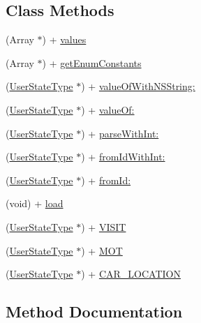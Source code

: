 \subsection*{Class Methods}
\begin{DoxyCompactItemize}
\item 
(Array $\ast$) + \hyperlink{interface_user_state_type_ac7410af507f71f5ce783c3c86fea81da}{values}
\item 
(Array $\ast$) + \hyperlink{interface_user_state_type_ac071a93de8993b92abc76691088d607a}{get\+Enum\+Constants}
\item 
(\hyperlink{interface_user_state_type}{User\+State\+Type} $\ast$) + \hyperlink{interface_user_state_type_a626874c56089cbc39f5290d61a8a79de}{value\+Of\+With\+N\+S\+String\+:}
\item 
(\hyperlink{interface_user_state_type}{User\+State\+Type} $\ast$) + \hyperlink{interface_user_state_type_a6f6918d4301c0e7ef30532d27d5bb4fe}{value\+Of\+:}
\item 
(\hyperlink{interface_user_state_type}{User\+State\+Type} $\ast$) + \hyperlink{interface_user_state_type_a741552a606b8425d11696688b4726f84}{parse\+With\+Int\+:}
\item 
(\hyperlink{interface_user_state_type}{User\+State\+Type} $\ast$) + \hyperlink{interface_user_state_type_a6039e7c90b9adaed6db9e184e3a43026}{from\+Id\+With\+Int\+:}
\item 
(\hyperlink{interface_user_state_type}{User\+State\+Type} $\ast$) + \hyperlink{interface_user_state_type_a94e6604257e4d429594803515d29027d}{from\+Id\+:}
\item 
(void) + \hyperlink{interface_user_state_type_a1b4bc0140a8726a97228332426b23031}{load}
\item 
(\hyperlink{interface_user_state_type}{User\+State\+Type} $\ast$) + \hyperlink{interface_user_state_type_a644111d61b871cd87cd6a302f6dd2686}{V\+I\+S\+I\+T}
\item 
(\hyperlink{interface_user_state_type}{User\+State\+Type} $\ast$) + \hyperlink{interface_user_state_type_a6a6671bf8cb10f2c5236cbe5de069d2a}{M\+O\+T}
\item 
(\hyperlink{interface_user_state_type}{User\+State\+Type} $\ast$) + \hyperlink{interface_user_state_type_a791e3eca2ced0224a2344317098c1bfb}{C\+A\+R\+\_\+\+L\+O\+C\+A\+T\+I\+O\+N}
\end{DoxyCompactItemize}


\subsection{Method Documentation}
\hypertarget{interface_user_state_type_a791e3eca2ced0224a2344317098c1bfb}{}
